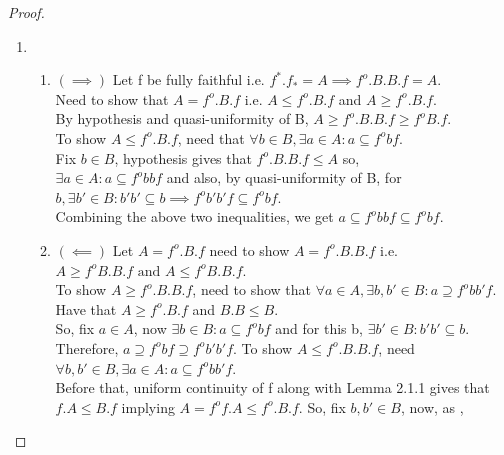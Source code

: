 \documentclass[a4paper]{article}
\theoremstyle{definition}
\begin{document}
			\begin{proof}\setcounter{equation}{0}

			\item
				\begin{enumerate}[label=(\alph*)]
					\item \begin{enumerate}[label=(\roman*)]
						\item $ (\implies) $ Let f be fully faithful i.e. $f^*.f_*=A
							\implies f^o .B.B.f=A $.\\
							Need to show that $A= f^o .B.f$ i.e.
							$A\leq f^o .B.f$ and  $A\geq f^o .B.f$.\\
							By hypothesis and quasi-uniformity of B,
							$A\geq f^o .B.B.f \geq f^o B.f $.\\
							To show $A \leq f^o .B.f$, need that $\forall b \in B, \exists a
							\in A : a \subseteq f^o bf$.\\
							Fix $b\in B$, hypothesis gives that $f^o .B.B.f \leq A$ so, \\
							$\exists a \in A: a \subseteq f^o bbf$ and also, by
							quasi-uniformity of B, for $b, \exists b' \in B : b'b' \subseteq b
							\implies f^o b'b'f \subseteq f^o bf$.\\
							Combining the above two inequalities, we get							$a \subseteq f^o bbf \subseteq f^o bf$.\\
						\item $(\impliedby)$ Let $A=f^o .B.f$ need to show $A=f^o.B.B.f$ i.e.
							$A\geq f^o B.B.f \text{ and } A\leq f^o B.B.f$.\\
							To show $A\geq f^o .B.B.f$, need to show that $\forall a\in A,
							\exists b,b' \in B : a \supseteq f^o bb'f$.\\
							Have that $A\geq f^o .B.f$ and $B.B \leq B$.\\
							So, fix $a \in A$, now $\exists b\in B: a \subseteq f^o bf$
							and for this b, $\exists b'\in B: b'b' \subseteq b$.
							Therefore, $a \supseteq f^o bf \supseteq f^o b'b' f$.
							To show $A\leq f^o .B.B.f$, need $\forall b,b'\in B, \exists
							a\in A : a \subseteq f^o bb'f$.\\
							Before that, uniform continuity
							of f along with Lemma 2.1.1 gives that
							$f.A\leq B.f$
							implying $A=f^o f.A \leq f^o.B.f$.
							So, fix $b,b' \in B $, now, as ,


\end{enumerate}
\end{enumerate}
\end{proof}
\end{document}

